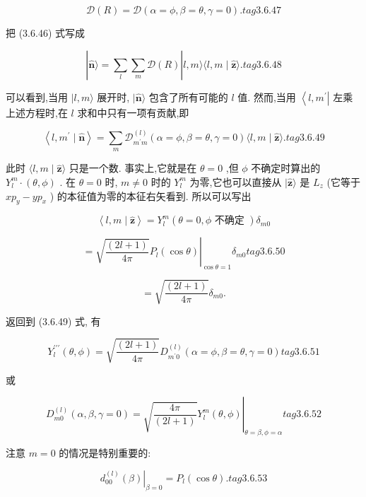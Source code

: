 $$
\mathcal{D}\left( R\right) = \mathcal{D}\left( {\alpha = \phi ,\beta = \theta ,\gamma = 0}\right) . tag{3. 6.47}
$$

把 (3.6.46) 式写成

$$
\left| {\widehat{\mathbf{n}}\rangle = \mathop{\sum }\limits_{l}\mathop{\sum }\limits_{m}\mathcal{D}\left( R\right) }\right| l, m\rangle \langle l, m \mid \widehat{\mathbf{z}}\rangle . tag{3. 6.48}
$$

可以看到,当用 $|l, m\rangle$ 展开时, $|\widehat{\mathbf{n}}\rangle$ 包含了所有可能的 $l$ 值. 然而,当用 $\left\langle {l,{m}^{\prime }}\right|$ 左乘上述方程时,在 $l$ 求和中只有一项有贡献,即

$$
\left\langle {l,{m}^{\prime } \mid \widehat{\mathbf{n}}}\right\rangle = \mathop{\sum }\limits_{m}{\mathcal{D}}_{{m}^{\prime }m}^{\left( l\right) }\left( {\alpha = \phi ,\beta = \theta ,\gamma = 0}\right) \langle l, m \mid \widehat{\mathbf{z}}\rangle . tag{3.6.49}
$$

此时 $\langle l, m \mid \widehat{\mathbf{z}}\rangle$ 只是一个数. 事实上,它就是在 $\theta = 0$ ,但 $\phi$ 不确定时算出的 ${Y}_{l}^{m} \cdot \left( {\theta ,\phi }\right)$ . 在 $\theta = 0$ 时, $m \neq 0$ 时的 ${Y}_{l}^{m}$ 为零,它也可以直接从 $|\widehat{\mathbf{z}}\rangle$ 是 ${L}_{z}$ (它等于 $x{p}_{y} - y{p}_{x}$ ) 的本征值为零的本征右矢看到. 所以可以写出

$$
\left\langle {l, m \mid \widehat{\mathbf{z}}}\right\rangle = {Y}_{l}^{m}\left( {\theta = 0,\phi \text{ 不确定 }}\right) {\delta }_{m0}
$$

$$
= {\left. \sqrt{\frac{\left( 2l + 1\right) }{4\pi }}{P}_{l}\left( \cos \theta \right) \right| }_{\cos \theta = 1}{\delta }_{m0} tag{3. 6.50}
$$

$$
= \sqrt{\frac{\left( 2l + 1\right) }{4\pi }}{\delta }_{m0}.
$$

返回到 (3.6.49) 式, 有

$$
{Y}_{l}^{\prime \prime \prime }\left( {\theta ,\phi }\right) = \sqrt{\frac{\left( 2l + 1\right) }{4\pi }}{D}_{{m}^{\prime }0}^{\left( l\right) }\left( {\alpha = \phi ,\beta = \theta ,\gamma = 0}\right) tag{3. 6.51}
$$

或

$$
{\left. {D}_{m0}^{\left( l\right) }\left( \alpha ,\beta ,\gamma = 0\right) = \sqrt{\frac{4\pi }{\left( 2l + 1\right) }}{Y}_{l}^{m}\left( \theta ,\phi \right) \right| }_{\theta = \beta ,\phi = \alpha } tag{3. 6.52}
$$

注意 $m = 0$ 的情况是特别重要的:

$$
{\left. {d}_{00}^{\left( l\right) }\left( \beta \right) \right| }_{\beta = 0} = {P}_{l}\left( {\cos \theta }\right) . tag{3. 6.53}
$$

